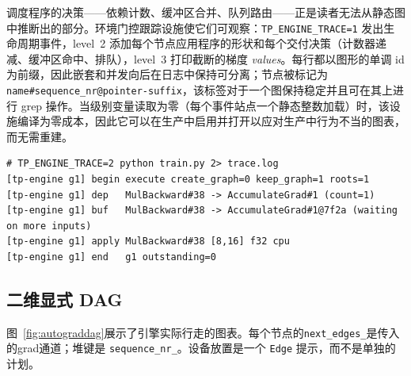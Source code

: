 调度程序的决策——依赖计数、缓冲区合并、队列路由——正是读者无法从静态图中推断出的部分。环境门控跟踪设施使它们可观察：\texttt{TP\_ENGINE\_TRACE=1} 发出生命周期事件，level~2 添加每个节点应用程序的形状和每个交付决策（计数器递减、缓冲区命中、排队），level~3 打印截断的梯度 \emph{values}。每行都以图形的单调 id 为前缀，因此嵌套和并发向后在日志中保持可分离；节点被标记为 \texttt{name\#sequence\_nr@pointer-suffix}，该标签对于一个图保持稳定并且可在其上进行 grep 操作。当级别变量读取为零（每个事件站点一个静态整数加载）时，该设施编译为零成本，因此它可以在生产中启用并打开以应对生产中行为不当的图表，而无需重建。

\begin{lstlisting}[caption={Trace output is designed to be read: graph id, stable node labels, and the decision being made.}, style=pystyle]
# TP_ENGINE_TRACE=2 python train.py 2> trace.log
[tp-engine g1] begin execute create_graph=0 keep_graph=1 roots=1
[tp-engine g1] dep   MulBackward#38 -> AccumulateGrad#1 (count=1)
[tp-engine g1] buf   MulBackward#38 -> AccumulateGrad#1@7f2a (waiting on more inputs)
[tp-engine g1] apply MulBackward#38 [8,16] f32 cpu
[tp-engine g1] end   g1 outstanding=0
\end{lstlisting}


\subsection{二维显式 DAG}
\label{subsec:dagfig}

图~\ref{fig:autograddag}展示了引擎实际行走的图表。每个节点的\texttt{next\_edges\_}是传入的grad通道；堆键是 \texttt{sequence\_nr\_}。设备放置是一个 \texttt{Edge} 提示，而不是单独的计划。

